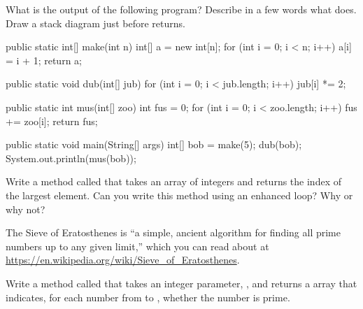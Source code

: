 \begin{exercise}  %

What is the output of the following program?
Describe in a few words what  does.
Draw a stack diagram just before  returns.

\begin{code}
public static int[] make(int n) {
    int[] a = new int[n];
    for (int i = 0; i < n; i++) {
        a[i] = i + 1;
    }
    return a;
}
\end{code}

\begin{code}
public static void dub(int[] jub) {
    for (int i = 0; i < jub.length; i++) {
        jub[i] *= 2;
    }
}
\end{code}

\begin{code}
public static int mus(int[] zoo) {
    int fus = 0;
    for (int i = 0; i < zoo.length; i++) {
        fus += zoo[i];
    }
    return fus;
}
\end{code}

\begin{code}
public static void main(String[] args) {
    int[] bob = make(5);
    dub(bob);
    System.out.println(mus(bob));
}
\end{code}

\end{exercise}


\begin{exercise}  %

Write a method called  that takes an array of integers and returns the index of the largest element.
Can you write this method using an enhanced  loop?
Why or why not?

\end{exercise}


\begin{exercise}  %

The Sieve of Eratosthenes is ``a simple, ancient algorithm for finding all prime numbers up to any given limit,'' which you can read about at \url{https://en.wikipedia.org/wiki/Sieve_of_Eratosthenes}.

Write a method called  that takes an integer parameter, , and returns a  array that indicates, for each number from  to , whether the number is prime.

\end{exercise}


